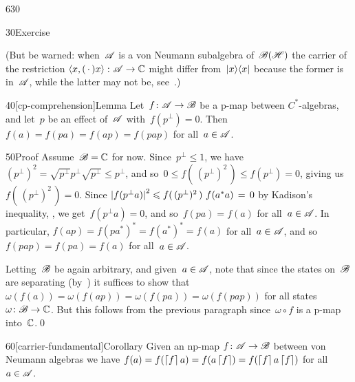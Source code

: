 \begin{parsec}{630}
\begin{point}{30}{Exercise}
\begin{enumerate}
(But be warned: when~$\scrA$ is a von Neumann subalgebra of~$\scrB(\scrH)$
the carrier of the restriction 
$\left<x,(\,\cdot\,)x\right>\colon \scrA\to\C$
might differ from~$\ketbra{x}{x}$ because the former is in~$\scrA$,
while the latter may not be, see~.)
\end{enumerate}
\spacingfix%
\end{point}%
\begin{point}{40}[cp-comprehension]{Lemma}%
Let~$f\colon \scrA\to\scrB$ be a p-map between
$C^*$-algebras,
and let~$p$ be an effect of~$\scrA$ with~$f(p^\perp)=0$.
Then $f(a)=f(pa)=f(ap)=f(pap)$
for all~$a\in\scrA$.
\begin{point}{50}{Proof}%
Assume~$\scrB=\C$ for now.
Since~$p^\perp \leq 1$,
we have $(p^\perp)^2=\sqrt{p^\perp}p^\perp \sqrt{p^\perp}
\leq p^\perp$,
and so~$0\leq f(\,(p^\perp)^2\,) \leq f(p^\perp) = 0$,
giving us $f(\,(p^\perp)^2\,)=0$.
Since
$\left|\smash{f(p^\perp a)}\right|^2
\leq f(\,(p^\perp)^2\,)\  f(a^*a)\,=\, 0$
by Kadison's inequality, , 
we get~$f(p^\perp a)=0$, and so~$f(pa)=f(a)$ for all~$a\in\scrA$.
In particular,
$f(ap)=f(pa^*)^*=f(a^*)^*=f(a)$
for all~$a\in\scrA$,
and so~$f(pap)=f(pa)=f(a)$
for all~$a\in \scrA$.

Letting~$\scrB$ be again arbitrary,
and given~$a\in\scrA$,
note that
since the states on~$\scrB$ 
are separating (by~)
it suffices 
to show that $\omega(f(a))=\omega(f(ap))=\omega(f(pa))=
\omega(f(pap))$ for all
states $\omega \colon \scrB\to\C$.
But this follows from the previous paragraph
since~$\omega\circ f$
is a p-map into~$\C$.\qed
\end{point}
\end{point}
\begin{point}{60}[carrier-fundamental]{Corollary}%
Given an np-map $f\colon \scrA\to\scrB$
between von Neumann algebras
we have $f(a)=f(\ceil{f}a) = f(a\ceil{f})=f(\ceil{f}a\ceil{f})$
for all~$a\in\scrA$.
\end{point}
\end{parsec}

